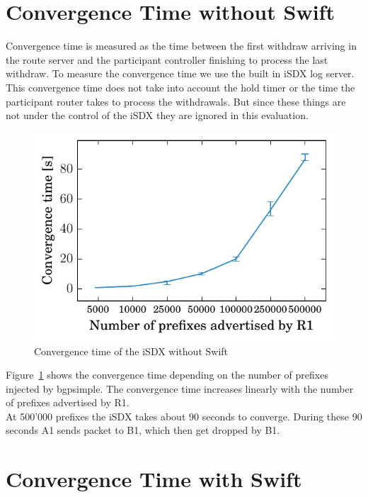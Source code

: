 \section{\label{chapter4:Convergence time without Swift}Convergence Time without Swift}

Convergence time is measured as the time between the first withdraw arriving in the route server and the participant controller finishing to process the last withdraw. To measure the convergence time we use the built in iSDX log server.\\
This convergence time does not take into account the hold timer or the time the participant router takes to process the withdrawals. But since these things are not under the control of the iSDX they are ignored in this evaluation.

\begin{figure}[h]
\center
\includegraphics[scale = 1]{Figures/noswift.pdf}
\caption{Convergence time of the iSDX without Swift}
\label{fig:noswift}
\end{figure}

Figure~\ref{fig:noswift} shows the convergence time depending on the number of prefixes injected by bgpsimple.
The convergence time increases linearly with the number of prefixes advertised by R1. \\
At 500'000 prefixes the iSDX takes about 90 seconds to converge. During these 90 seconds A1 sends packet to B1, which then get dropped by B1. 

\section{\label{chapter4:Convergence time with Swift}Convergence Time with Swift}

